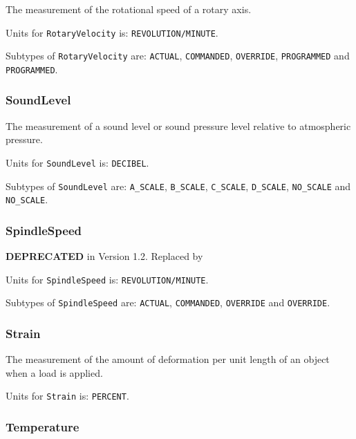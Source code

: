 The measurement of the rotational speed of a rotary axis.


Units for \texttt{RotaryVelocity} is: \texttt{REVOLUTION/MINUTE}.


Subtypes of \texttt{RotaryVelocity} are: \texttt{ACTUAL}, \texttt{COMMANDED}, \texttt{OVERRIDE}, \texttt{PROGRAMMED} and \texttt{PROGRAMMED}. 
\FloatBarrier

\subsubsection{SoundLevel}
  \label{sec:SoundLevel}



The measurement of a sound level or sound pressure level relative to atmospheric pressure.


Units for \texttt{SoundLevel} is: \texttt{DECIBEL}.


Subtypes of \texttt{SoundLevel} are: \texttt{A_SCALE}, \texttt{B_SCALE}, \texttt{C_SCALE}, \texttt{D_SCALE}, \texttt{NO_SCALE} and \texttt{NO_SCALE}. 
\FloatBarrier

\subsubsection{SpindleSpeed}
  \label{sec:SpindleSpeed}



\textbf{DEPRECATED} in Version 1.2.  Replaced by 


Units for \texttt{SpindleSpeed} is: \texttt{REVOLUTION/MINUTE}.


Subtypes of \texttt{SpindleSpeed} are: \texttt{ACTUAL}, \texttt{COMMANDED}, \texttt{OVERRIDE} and \texttt{OVERRIDE}. 
\FloatBarrier

\subsubsection{Strain}
  \label{sec:Strain}



The measurement of the amount of deformation per unit length of an object when a load is applied.


Units for \texttt{Strain} is: \texttt{PERCENT}.

\FloatBarrier

\subsubsection{Temperature}
  \label{sec:Temperature}



